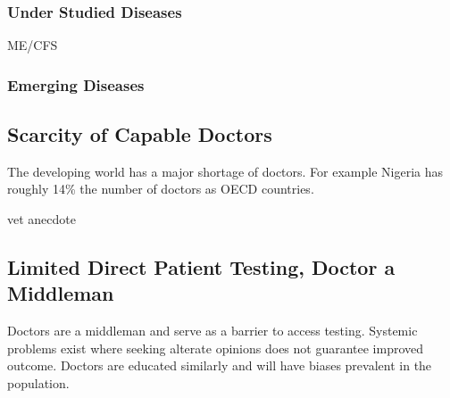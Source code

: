 \documentclass{article}
\begin{document}
\subsubsection{Under Studied Diseases}

ME/CFS

\subsubsection{Emerging Diseases}

\subsection{Scarcity of Capable Doctors}


The developing world has a major shortage of doctors. For example Nigeria has roughly 14\% the number of doctors as OECD countries. \cite{wef2014}


vet anecdote



\cite{ferguson2007patients}

\subsection{Limited Direct Patient Testing, Doctor a Middleman}

Doctors are a middleman and serve as a barrier to access testing. Systemic problems exist where seeking alterate opinions does not guarantee improved outcome. Doctors are educated similarly and will have biases prevalent in the population. 

\cite{CarsonDesktop}
\end{document}
